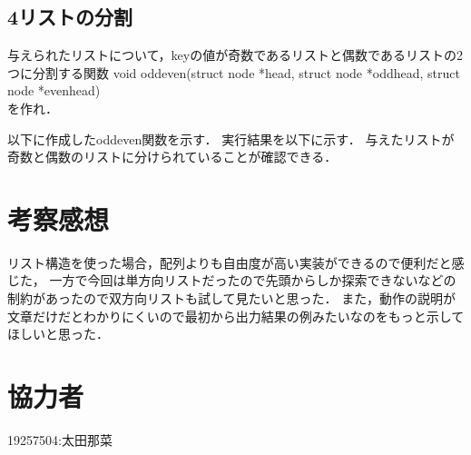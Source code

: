 \documentclass[titlepage]{jarticle}
\begin{document}
\subsection*{4リストの分割}
与えられたリストについて，keyの値が奇数であるリストと偶数であるリストの2つに分割する関数
void oddeven(struct node *head, struct node *oddhead, struct node *evenhead)
\\を作れ．

以下に作成したoddeven関数を示す．
実行結果を以下に示す．
与えたリストが奇数と偶数のリストに分けられていることが確認できる．
\section*{考察感想}
リスト構造を使った場合，配列よりも自由度が高い実装ができるので便利だと感じた，
一方で今回は単方向リストだったので先頭からしか探索できないなどの制約があったので双方向リストも試して見たいと思った．
また，動作の説明が文章だけだとわかりにくいので最初から出力結果の例みたいなのをもっと示してほしいと思った．
\section*{協力者}
19257504:太田那菜
\end{document}
